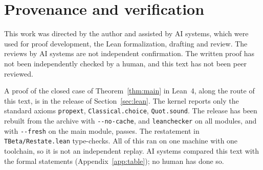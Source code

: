 \documentclass[a4paper,english]{lipics-v2021}
\newcommand{\lean}[1]{\texttt{#1}}
\begin{document}
\section*{Provenance and verification}\label{sec:provenance}

This work was directed by the author and assisted by AI systems, which were used for proof development, the Lean formalization, drafting and review. The reviews by AI systems are not independent confirmation. The written proof has not been independently checked by a human, and this text has not been peer reviewed.

A proof of the closed case of Theorem~\ref{thm:main} in Lean~4, along the route of this text, is in the release of Section~\ref{sec:lean}. The kernel reports only the standard axioms \lean{propext}, \lean{Classical.choice}, \lean{Quot.sound}. The release has been rebuilt from the archive with \lean{-{}-no-cache}, and \lean{leanchecker} on all modules, and with \lean{-{}-fresh} on the main module, passes. The restatement in \lean{TBeta/Restate.lean} type-checks. All of this ran on one machine with one toolchain, so it is not an independent replay. AI systems compared this text with the formal statements (Appendix~\ref{app:table}); no human has done so.
\end{document}
